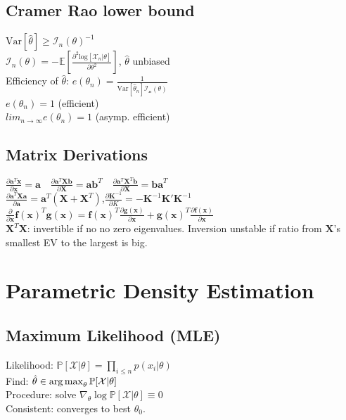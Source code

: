\subsection*{Cramer Rao lower bound}
$\mathrm{Var}[\hat{\theta}]\geq \mathcal{I}_n(\theta)^{-1}$\\
$\mathcal{I}_n(\theta) = -\mathbb{E}[\frac{\partial^2 \mathrm{log}[\mathcal{X}_n|\theta]}{\partial \theta^2}]$, $\hat{\theta}$ unbiased\\
Efficiency of $\hat{\theta}$: $e(\theta_n)=\frac{1}{\mathrm{Var}[\hat{\theta}_n]\mathcal{I_n(\theta)}}$\\
$e(\theta_n) = 1$ (efficient)\\
$lim_{n\rightarrow\infty}e(\theta_n) = 1$ (asymp. efficient)

\subsection*{Matrix Derivations}
$\frac{\partial \mathbf{a}^T\mathbf{x}}{\partial\mathbf{x}}{=}\mathbf{a} \quad \frac{\partial \mathbf{a}^T\mathbf{Xb}}{\partial\mathbf{X}}{=}\mathbf{ab}^T \quad \frac{\partial \mathbf{a}^T\mathbf{X}^T\mathbf{b}}{\partial\mathbf{X}}{=}\mathbf{ba}^T $\\
$\frac{\partial \mathbf{a}^T\mathbf{Xa}}{\partial\mathbf{a}}{=}\mathbf{a}^T(\mathbf{X}+\mathbf{X}^T)$,$\frac{\partial \mathbf{K}^{-1}}{\partial K}=-\mathbf{K}^{-1}\mathbf{K}'\mathbf{K}^{-1}$\\
 $\frac{\partial}{\partial\mathbf{x}} \mathbf{f(x)}^T\mathbf{g(x)}{=}\mathbf{f(x)}^T\frac{\partial \mathbf{g(x)}}{\partial\mathbf{x}}+\mathbf{g(x)}^T\frac{\partial\mathbf{f(x)}}{\partial\mathbf{x}}$\\
$\mathbf{X}^T\mathbf{X}$: invertible if no no zero eigenvalues.
Inversion unstable if ratio from $\mathbf{X}$'s smallest EV to the largest is big.

\section*{Parametric Density Estimation}
\subsection*{Maximum Likelihood (MLE)}
Likelihood: $\mathbb{P}[\mathcal{X}|\theta]=\prod_{i\leq n}p(x_i|\theta)$\\
Find: $\hat{\theta}\in \operatorname*{arg\,max}_\theta \mathbb{P}[\mathcal{X}|\theta]$\\
Procedure: solve $\nabla_\theta \log \mathbb{P}[\mathcal{X}|\theta]\equiv 0$\\
Consistent: converges to best $\theta_0$.

